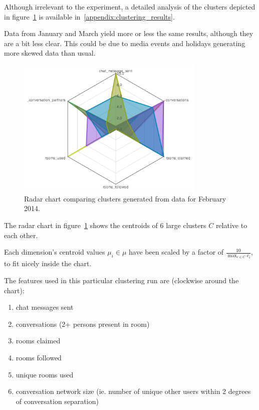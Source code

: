 Although irrelevant to the experiment, a detailed analysis of the clusters depicted in figure~\ref{fig:radar-clusters-february} is available in~\ref{appendix:clustering_results}.

Data from January and March yield more or less the same results, although they are a bit less clear. This could be due to media events and holidays generating more skewed data than usual.

\begin{figure}[h]
  \centering
    \includegraphics[width=0.8\textwidth]{Figures/clusterings/confluence-post/comp-02-feb}
    \caption{Radar chart comparing clusters generated from data for February 2014.}
    \label{fig:radar-clusters-february}
\end{figure}

The radar chart in figure~\ref{fig:radar-clusters-february} shows the centroids of 6 large clusters $C$ relative to each other.

Each dimension's centroid values $\mu_i \in \mu$ have been scaled by a factor of $\frac{10}{\max_{c \in C}{c_i}}$, to fit nicely inside the chart.

The features used in this particular clustering run are (clockwise around the chart):

\begin{enumerate}
  \item chat messages sent
  \item conversations (2+ persons present in room)
  \item rooms claimed
  \item rooms followed
  \item unique rooms used
  \item conversation network size (ie. number of unique other users within 2 degrees of conversation separation)
\end{enumerate}

